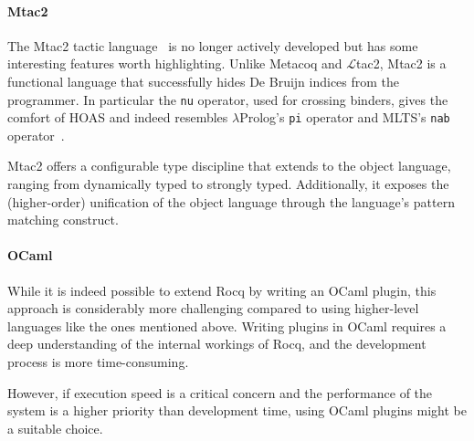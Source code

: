 \documentclass[sigplan,natbib=false]{acmart}
\begin{document}
\paragraph{Mtac2}

The Mtac2 tactic language~\cite{10.1145/3236773} is no longer actively
developed but has some interesting features worth highlighting. Unlike Metacoq
and $\mathcal{L}$tac2, Mtac2 is a functional language that successfully hides
De Bruijn indices from the programmer. In particular the \texttt{nu} operator, used for
crossing binders, gives the comfort of HOAS and indeed
resembles $\lambda$Prolog's \texttt{pi} operator and MLTS's \texttt{nab}
operator~\cite{10.1145/3354166.3354177}.

Mtac2 offers a configurable type discipline that extends to the object
language, ranging from dynamically typed to strongly typed.
Additionally, it exposes the (higher-order) unification of the object
language through the language's pattern matching construct.

\paragraph{OCaml}
%
While it is indeed possible to extend Rocq by writing an
OCaml plugin, this approach is considerably more challenging compared to using
higher-level languages like the ones mentioned above. Writing plugins in OCaml requires a deep
understanding of the internal workings of Rocq, and the development process is
more time-consuming.

However, if execution speed is a critical concern and the performance of the
system is a higher priority than development time, using OCaml plugins might be
a suitable choice.

\newpage

\printbibliography
\end{document}
